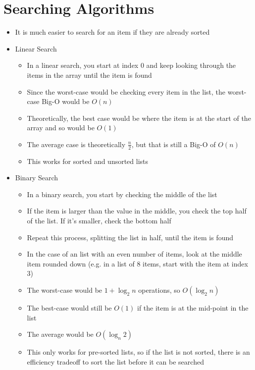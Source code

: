 
\section*{Searching Algorithms}

\begin{itemize}
  \item It is much easier to search for an item if they are already sorted
  \item Linear Search
  \begin{itemize}
    \item In a linear search, you start at index 0 and keep looking through the items in the array until the item is found
    \item Since the worst-case would be checking every item in the list, the worst-case Big-O would be $O(n)$
    \item Theoretically, the best case would be where the item is at the start of the array and so would be $O(1)$
    \item The average case is theoretically $\frac{n}{2}$, but that is still a Big-O of $O(n)$
    \item This works for sorted and unsorted lists
  \end{itemize}
  \item Binary Search
  \begin{itemize}
    \item In a binary search, you start by checking the middle of the list
    \item If the item is larger than the value in the middle, you check the top half of the list. If it's smaller, check the bottom half
    \item Repeat this process, splitting the list in half, until the item is found
    \item In the case of an list with an even number of items, look at the middle item rounded down (e.g. in a list of 8 items, start with the item at index 3)
    \item The worst-case would be $1 + \log_2 n$ operations, so $O(\log_2 n)$
    \item The best-case would still be $O(1)$ if the item is at the mid-point in the list
    \item The average would be $O(\log_n 2)$
    \item This only works for pre-sorted lists, so if the list is not sorted, there is an efficiency tradeoff to sort the list before it can be searched
  \end{itemize}
\end{itemize}

